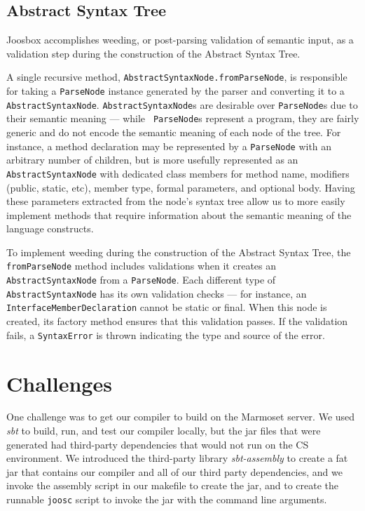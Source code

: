 \documentclass[letterpaper]{article}
\begin{document}
  \subsection{Abstract Syntax Tree}

  Joosbox accomplishes weeding, or post-parsing validation of semantic input, as
  a validation step during the construction of the Abstract Syntax Tree.

  A single recursive method, {\tt AbstractSyntaxNode.fromParseNode}, is
  responsible for taking a {\tt ParseNode} instance generated by the parser and
  converting it to a {\tt AbstractSyntaxNode}. {\tt AbstractSyntaxNode}s are
  desirable over {\tt ParseNode}s due to their semantic meaning --- while {\tt
  ParseNode}s represent a program, they are fairly generic and do not encode the
  semantic meaning of each node of the tree. For instance, a method declaration
  may be represented by a {\tt ParseNode} with an arbitrary number of children,
  but is more usefully represented as an {\tt AbstractSyntaxNode} with dedicated
  class members for method name, modifiers (public, static, etc), member type,
  formal parameters, and optional body. Having these parameters extracted from
  the node's syntax tree allow us to more easily implement methods that require
  information about the semantic meaning of the language constructs.

  To implement weeding during the construction of the Abstract Syntax Tree, the
  {\tt fromParseNode} method includes validations when it creates an {\tt
  AbstractSyntaxNode} from a {\tt ParseNode}. Each different type of {\tt
  AbstractSyntaxNode}  has its own validation checks --- for instance, an {\tt
  InterfaceMemberDeclaration} cannot be static  or final. When this node is
  created, its factory method ensures that this validation passes. If the
  validation  fails, a {\tt SyntaxError} is thrown indicating the type and
  source of the error.

  \section{Challenges}

  One challenge was to get our compiler to build on the Marmoset server. We used
  {\em sbt} to build, run, and test our compiler locally, but the jar files that
  were generated had third-party dependencies that would not run on the CS
  environment. We introduced the third-party library {\em sbt-assembly} to
  create a fat jar that contains our compiler and all of our third party
  dependencies, and we invoke the assembly script in our makefile to create the
  jar, and to create the runnable {\tt joosc} script to invoke the jar with the
  command line arguments.
\end{document}
